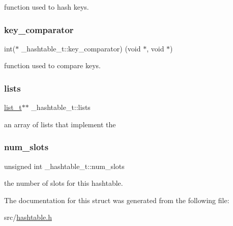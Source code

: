 function used to hash keys. 

\hypertarget{struct__hashtable__t_abb515b666a0adc3ebed1f815af2ac367}{}\label{struct__hashtable__t_abb515b666a0adc3ebed1f815af2ac367} 
\subsubsection{\texorpdfstring{key\+\_\+comparator}{key\_comparator}}
{\footnotesize\ttfamily int($\ast$ \+\_\+hashtable\+\_\+t\+::key\+\_\+comparator) (void $\ast$, void $\ast$)}



function used to compare keys. 

\hypertarget{struct__hashtable__t_a56b35ee01c14fd9e50595decd7077614}{}\label{struct__hashtable__t_a56b35ee01c14fd9e50595decd7077614} 
\subsubsection{\texorpdfstring{lists}{lists}}
{\footnotesize\ttfamily \hyperlink{list_8h_a0827dd560c5b281863fea20f22abeff6}{list\+\_\+t}$\ast$$\ast$ \+\_\+hashtable\+\_\+t\+::lists}



an array of lists that implement the 

\hypertarget{struct__hashtable__t_a84bd70632a7cb9d77aaa0f9d4ce10adc}{}\label{struct__hashtable__t_a84bd70632a7cb9d77aaa0f9d4ce10adc} 
\subsubsection{\texorpdfstring{num\+\_\+slots}{num\_slots}}
{\footnotesize\ttfamily unsigned int \+\_\+hashtable\+\_\+t\+::num\+\_\+slots}



the number of slots for this hashtable. 



The documentation for this struct was generated from the following file\+:\begin{DoxyCompactItemize}
\item 
src/\hyperlink{hashtable_8h}{hashtable.\+h}\end{DoxyCompactItemize}
